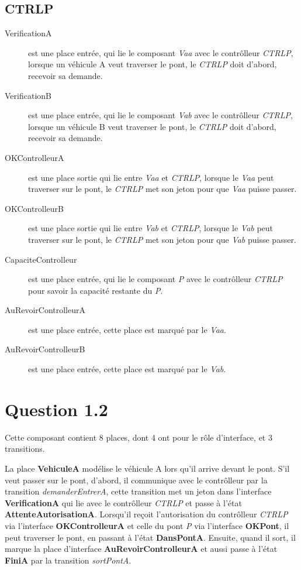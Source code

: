 \documentclass[a4paper,11pt]{report}
\begin{document}
	\subsection{CTRLP}
	\begin{description}
		\item[VerificationA] est une place entrée, qui lie le composant \textit{Vaa} avec le contrôlleur \textit{CTRLP}, lorsque un véhicule A veut traverser le pont, le \textit{CTRLP} doit d'abord, recevoir sa demande.
		\item[VerificationB] est une place entrée, qui lie le composant \textit{Vab} avec le contrôlleur \textit{CTRLP}, lorsque un véhicule B veut traverser le pont, le \textit{CTRLP} doit d'abord, recevoir sa demande.
		\item[OKControlleurA] est une place sortie qui lie entre \textit{Vaa} et \textit{CTRLP}, lorsque le \textit{Vaa} peut traverser sur le pont, le \textit{CTRLP} met son jeton pour que \textit{Vaa} puisse passer.
		\item[OKControlleurB] est une place sortie qui lie entre \textit{Vab} et \textit{CTRLP}, lorsque le \textit{Vab} peut traverser sur le pont, le \textit{CTRLP} met son jeton pour que \textit{Vab} puisse passer.
		\item[CapaciteControlleur] est une place entrée, qui lie le composant \textit{P} avec le contrôlleur \textit{CTRLP} pour savoir la capacité restante du \textit{P}.
		\item[AuRevoirControlleurA] est une place entrée, cette place est marqué par le \textit{Vaa}.
		\item[AuRevoirControlleurB] est une place entrée, cette place est marqué par le \textit{Vab}.
	\end{description}	
	
\section{Question 1.2}
	Cette composant contient 8 places, dont 4 ont pour le rôle d'interface, et 3 transitions.
	
	La place \textbf{VehiculeA} modélise le véhicule A  lors qu'il arrive devant le pont. S'il veut passer sur le pont, d'abord, il communique avec le contrôlleur par la transition \textit{demanderEntrerA}, cette transition met un jeton dans l'interface \textbf{VerificationA} qui lie avec le contrôlleur \textit{CTRLP} et passe à l'état \textbf{AttenteAutorisationA}. Lorsqu'il reçoit l'autorisation du contrôlleur \textit{CTRLP} via l'interface \textbf{OKControlleurA} et celle du pont \textit{P} via l'interface \textbf{OKPont}, il peut traverser le pont, en passant à l'état \textbf{DansPontA}. Ensuite, quand il sort, il marque la place d'interface \textbf{AuRevoirControlleurA} et aussi passe à l'état \textbf{FiniA} par la transition \textit{sortPontA}.
	
\end{document}

